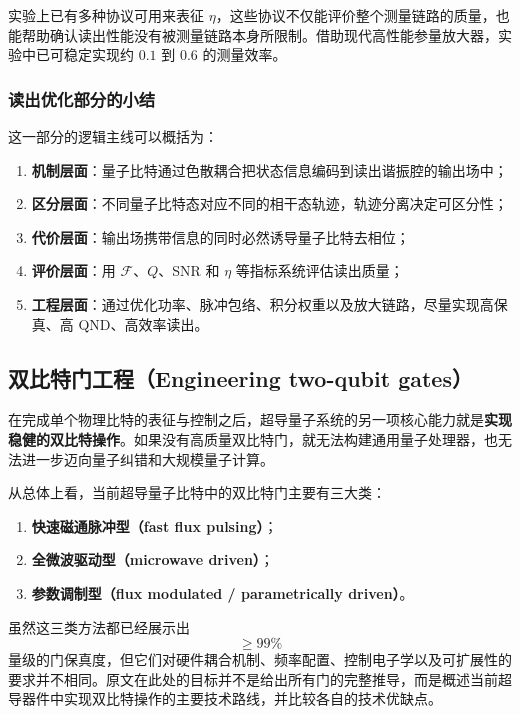 \documentclass[12pt,a4paper,oneside]{ctexbook}
\begin{document}
实验上已有多种协议可用来表征 \(\eta\)，这些协议不仅能评价整个测量链路的质量，也能帮助确认读出性能没有被测量链路本身所限制。借助现代高性能参量放大器，实验中已可稳定实现约 \(0.1\) 到 \(0.6\) 的测量效率。

\subsubsection{读出优化部分的小结}

这一部分的逻辑主线可以概括为：

\begin{enumerate}
    \item \textbf{机制层面}：量子比特通过色散耦合把状态信息编码到读出谐振腔的输出场中；
    \item \textbf{区分层面}：不同量子比特态对应不同的相干态轨迹，轨迹分离决定可区分性；
    \item \textbf{代价层面}：输出场携带信息的同时必然诱导量子比特去相位；
    \item \textbf{评价层面}：用 \(\mathcal{F}\)、\(Q\)、SNR 和 \(\eta\) 等指标系统评估读出质量；
    \item \textbf{工程层面}：通过优化功率、脉冲包络、积分权重以及放大链路，尽量实现高保真、高 QND、高效率读出。
\end{enumerate}

\subsection{双比特门工程（Engineering two-qubit gates）}

在完成单个物理比特的表征与控制之后，超导量子系统的另一项核心能力就是\textbf{实现稳健的双比特操作}。如果没有高质量双比特门，就无法构建通用量子处理器，也无法进一步迈向量子纠错和大规模量子计算。

从总体上看，当前超导量子比特中的双比特门主要有三大类：
\begin{enumerate}
    \item \textbf{快速磁通脉冲型（fast flux pulsing）}；
    \item \textbf{全微波驱动型（microwave driven）}；
    \item \textbf{参数调制型（flux modulated / parametrically driven）}。
\end{enumerate}

虽然这三类方法都已经展示出
\[
\ge 99\%
\]
量级的门保真度，但它们对硬件耦合机制、频率配置、控制电子学以及可扩展性的要求并不相同。原文在此处的目标并不是给出所有门的完整推导，而是概述当前超导器件中实现双比特操作的主要技术路线，并比较各自的技术优缺点。
\end{document}
